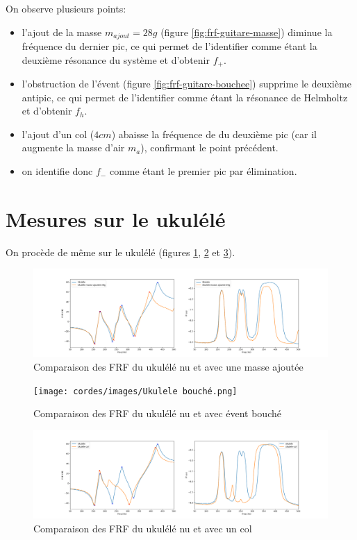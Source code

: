 \documentclass[atiam, article]{rapport} %
\begin{document}
On observe plusieurs points:
\begin{itemize}
    \item l'ajout de la masse $m_{ajout} = 28 \si{g}$ (figure \ref{fig:frf-guitare-masse}) diminue la fréquence du dernier pic, ce qui permet de l'identifier comme étant la deuxième résonance du système et d'obtenir $f_+$.
    \item l'obstruction de l'évent (figure \ref{fig:frf-guitare-bouchee}) supprime le deuxième antipic, ce qui permet de l'identifier comme étant la résonance de Helmholtz et d'obtenir $f_h$.
    \item l'ajout d'un col ($4\si{cm}$) abaisse la fréquence de du deuxième pic (car il augmente la masse d'air $m_a$), confirmant le point précédent.
    \item on identifie donc $f_-$ comme étant le premier pic par élimination.
\end{itemize}

\section{Mesures sur le ukulélé}
On procède de même sur le ukulélé (figures \ref{fig:frf-uku-masse}, \ref{fig:frf-uku-bouche} et \ref{fig:frf-uku-col}).

\begin{figure}
    \centering
    \includegraphics[width=\textwidth]{cordes/images/Ukulele masse ajoutee 20g.png}
    \caption{Comparaison des FRF du ukulélé nu et avec une masse ajoutée}
    \label{fig:frf-uku-masse}
\end{figure}

\begin{figure}
    \centering
    \texttt{[image: cordes/images/Ukulele bouché.png]}
    \caption{Comparaison des FRF du ukulélé nu et avec évent bouché}
    \label{fig:frf-uku-bouche}
\end{figure}

\begin{figure}
    \centering
    \includegraphics[width=\textwidth]{cordes/images/Ukulele col.png}
    \caption{Comparaison des FRF du ukulélé nu et avec un col}
    \label{fig:frf-uku-col}
\end{figure}
\end{document}
